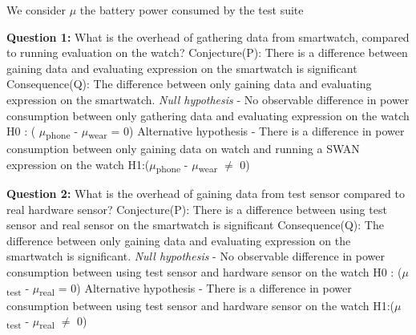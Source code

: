    We consider $\mu$ the battery power consumed by the test suite
    
    \textbf{Question 1:} What is the overhead of gathering data from smartwatch, compared to running evaluation on the watch? \newline
Conjecture(P): There is a difference between gaining data and evaluating expression on the smartwatch is significant \newline
Consequence(Q): The difference between only gaining data and evaluating expression on the smartwatch. \newline
\textit{Null hypothesis} - No observable difference in power consumption between only gathering data and evaluating expression on the watch \newline
H0 : ( $\mu$\textsubscript{phone} - $\mu$\textsubscript{wear} = 0) \newline
  Alternative hypothesis - There is a difference in power consumption between only gaining data on watch and running a SWAN expression on the watch \newline
H1:($\mu$\textsubscript{phone} - $\mu$\textsubscript{wear} $\neq$ 0)  \newline

    \textbf{Question 2:}  What is the overhead of gaining data from test sensor compared to real hardware sensor?\newline
    Conjecture(P): There is  a difference between using test sensor and real sensor on the smartwatch is significant\newline
    Consequence(Q): The difference between only gaining data and evaluating expression on the smartwatch is significant.\newline
    \textit{Null hypothesis} - No observable difference in power consumption between using test sensor and hardware sensor on the watch\newline
H0 : ($\mu$\textsubscript{test} - $\mu$\textsubscript{real} = 0)\newline
    Alternative hypothesis - There is a difference in power consumption between using test sensor and hardware sensor on the watch\newline
H1:($\mu$\textsubscript{test} - $\mu$\textsubscript{real} $\neq$ 0)\newline

